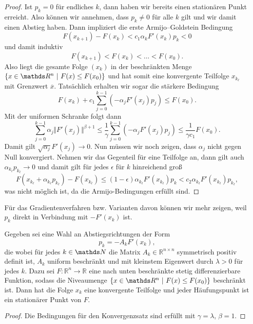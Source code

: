 \begin{proof}
Ist $p_k  = 0$ f\"ur endliches $k$, dann haben wir bereits einen station\"aren Punkt erreicht. Also k\"onnen wir annehmen, dass $p_k \neq 0$ f\"ur alle $k$ gilt und wir damit einen Abstieg haben. Dann impliziert die erste Armijo--Goldstein Bedingung
$$ F(x_{k+1}) - F(x_k) < c_1 \alpha_k F'(x_k) p_k < 0 $$
und damit induktiv
$$F(x_{k+1}) < F(x_k) < \ldots < F(x_0). $$
Also liegt die gesamte Folge $(x_k)$ in der beschr\"ankten Menge $ \{ x \in \R^n ~|~ F(x) \leq F(x_0) \}$ und hat somit eine konvergente Teilfolge $x_{k_\ell}$ mit Grenzwert $\overline{x}$. Tats\"achlich erhalten wir sogar die st\"arkere Bedingung
$$ F(x_k) + c_1 \sum_{j=0}^{k-1} (- \alpha_j F'(x_j) p_j) \leq F(x_0). $$
Mit der uniformen Schranke folgt dann 
$$   \sum_{j=0}^{k-1}  \alpha_j \Vert F'(x_j) \Vert^{\beta+1}  \leq \frac{1}\gamma \sum_{j=0}^{k-1} (- \alpha_j F'(x_j) p_j) 
\leq \frac{1}{\gamma c_1} F(x_0). $$
Damit gilt $\sqrt{\alpha_j} F'(x_j) \rightarrow 0$. Nun m\"ussen wir noch zeigen, dass $\alpha_j$ nicht gegen Null konvergiert. Nehmen wir das Gegenteil f\"ur eine Teilfolge an, dann gilt auch $\alpha_{k_\ell} p_{k_\ell} \rightarrow 0$ und damit gilt f\"ur jedes $\epsilon$ f\"ur $k$ hinreichend gro{\ss}
$$ F(x_{k_\ell} + \alpha_{k_\ell} p_{k_\ell}) - F(x_{k_\ell}) \leq (1-\epsilon) \alpha_{k_\ell} F'(x_{k_\ell}) p_k < c_2 \alpha_{k_\ell} F'(x_{k_\ell}) p_{k_\ell} ,$$
was nicht m\"oglich ist, da die Armijo-Bedingungen erfüllt sind. 
\end{proof}

Für das Gradientenverfahren bzw. Varianten davon können wir mehr zeigen, weil $p_k$ direkt in Verbindung mit $-F'(x_k)$ ist.
% 
\begin{corollary}{}{}
Gegeben sei eine Wahl an Abstiegsrichtungen der Form 
$$p_k= - A_k F'(x_k) , $$ die
wobei f\"ur jedes $k \in \N$ die Matrix $A_k \in \mathbb{R}^{n \times n}$ symmetrisch positiv definit ist, $A_k$ uniform beschr\"ankt und mit kleinstem Eigenwert durch  $\lambda>0 $ f\"ur jedes $k$.  
 Dazu sei $F: \mathbb{R}^n \rightarrow \mathbb{R}$ eine nach unten beschr\"ankte stetig differenzierbare Funktion, sodass die Niveaumenge $ \{ x \in \R^n ~|~ F(x) \leq F(x_0) \} $ beschr\"ankt ist. Dann hat die Folge $x_k$ eine konvergente Teilfolge und jeder H\"aufungspunkt ist ein station\"arer Punkt von $F$.
\end{corollary} 
\begin{proof}
Die Bedingungen für den Konvergenzsatz sind erfüllt mit $\gamma = \lambda$, $\beta = 1$. \end{proof}


